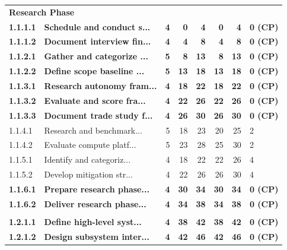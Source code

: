 \begin{longtable}{@{}llrrrrrl@{}}
\multicolumn{8}{l}{\textbf{Research Phase}} \\
\addlinespace
\textbf{1.1.1.1} & \textbf{Schedule and conduct s...} & \textbf{4} & \textbf{0} & \textbf{4} & \textbf{0} & \textbf{4} & \textbf{0 (CP)} \\
\textbf{1.1.1.2} & \textbf{Document interview fin...} & \textbf{4} & \textbf{4} & \textbf{8} & \textbf{4} & \textbf{8} & \textbf{0 (CP)} \\
\textbf{1.1.2.1} & \textbf{Gather and categorize ...} & \textbf{5} & \textbf{8} & \textbf{13} & \textbf{8} & \textbf{13} & \textbf{0 (CP)} \\
\textbf{1.1.2.2} & \textbf{Define scope baseline ...} & \textbf{5} & \textbf{13} & \textbf{18} & \textbf{13} & \textbf{18} & \textbf{0 (CP)} \\
\textbf{1.1.3.1} & \textbf{Research autonomy fram...} & \textbf{4} & \textbf{18} & \textbf{22} & \textbf{18} & \textbf{22} & \textbf{0 (CP)} \\
\textbf{1.1.3.2} & \textbf{Evaluate and score fra...} & \textbf{4} & \textbf{22} & \textbf{26} & \textbf{22} & \textbf{26} & \textbf{0 (CP)} \\
\textbf{1.1.3.3} & \textbf{Document trade study f...} & \textbf{4} & \textbf{26} & \textbf{30} & \textbf{26} & \textbf{30} & \textbf{0 (CP)} \\
1.1.4.1 & Research and benchmark... & 5 & 18 & 23 & 20 & 25 & 2 \\
1.1.4.2 & Evaluate compute platf... & 5 & 23 & 28 & 25 & 30 & 2 \\
1.1.5.1 & Identify and categoriz... & 4 & 18 & 22 & 22 & 26 & 4 \\
1.1.5.2 & Develop mitigation str... & 4 & 22 & 26 & 26 & 30 & 4 \\
\textbf{1.1.6.1} & \textbf{Prepare research phase...} & \textbf{4} & \textbf{30} & \textbf{34} & \textbf{30} & \textbf{34} & \textbf{0 (CP)} \\
\textbf{1.1.6.2} & \textbf{Deliver research phase...} & \textbf{4} & \textbf{34} & \textbf{38} & \textbf{34} & \textbf{38} & \textbf{0 (CP)} \\
\addlinespace
\multicolumn{8}{l}{\textbf{Design Phase}} \\
\addlinespace
\textbf{1.2.1.1} & \textbf{Define high-level syst...} & \textbf{4} & \textbf{38} & \textbf{42} & \textbf{38} & \textbf{42} & \textbf{0 (CP)} \\
\textbf{1.2.1.2} & \textbf{Design subsystem inter...} & \textbf{4} & \textbf{42} & \textbf{46} & \textbf{42} & \textbf{46} & \textbf{0 (CP)} \\

\end{longtable}
